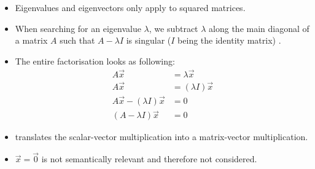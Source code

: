 \begin{itemize}
	\item Eigenvalues and eigenvectors only apply to squared matrices.
	\item When searching for an eigenvalue $\lambda$, we subtract $\lambda$ along the main diagonal of a matrix $A$ such that $A - \lambda I$ is \gls{singular} ($I$ being the identity matrix) \cite{Strang2005tn}.
	\item The entire factorisation looks as following:
	\begin{align}
		\label{formula:eigenONE}
		A \overrightarrow{x} &= \lambda \overrightarrow{x} 
		\\
		\label{formula:eigenTWO}
		A \overrightarrow{x} &= (\lambda I) \overrightarrow{x}
		\\
		\label{formula:eigenTHREE}
		A \overrightarrow{x} - (\lambda I) \overrightarrow{x} &= 0
		\\
		\label{formula:eigenFOUR}
		(A - \lambda  I) \overrightarrow{x} &= 0
	\end{align}
	\item {} translates the scalar-vector multiplication into a matrix-vector multiplication.
	\item $\overrightarrow{x} = \overrightarrow{0}$ is not semantically relevant and therefore not considered.
\end{itemize}





